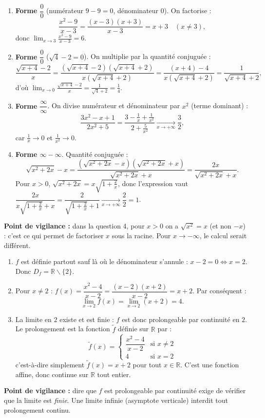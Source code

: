 \documentclass[11pt]{article}
\def\setminus{\mathbin{\backslash}}\let\smallsetminus\setminus
\begin{document}
\begin{corrige}
\begin{enumerate}
\item \textbf{Forme $\dfrac{0}{0}$} (numérateur $9-9=0$, dénominateur $0$). On factorise :
\[ \frac{x^2-9}{x-3}=\frac{(x-3)(x+3)}{x-3}=x+3 \quad (x\neq 3), \]
donc $\displaystyle\lim_{x\to 3}\frac{x^2-9}{x-3}=\boxed{6}$.
\item \textbf{Forme $\dfrac{0}{0}$} ($\sqrt{4}-2=0$). On multiplie par la quantité conjuguée :
\[ \frac{\sqrt{x+4}-2}{x}=\frac{(\sqrt{x+4}-2)(\sqrt{x+4}+2)}{x(\sqrt{x+4}+2)}=\frac{(x+4)-4}{x(\sqrt{x+4}+2)}=\frac{1}{\sqrt{x+4}+2}, \]
d'où $\displaystyle\lim_{x\to 0}\frac{\sqrt{x+4}-2}{x}=\frac{1}{\sqrt{4}+2}=\boxed{\frac{1}{4}}$.
\item \textbf{Forme $\dfrac{\infty}{\infty}$}. On divise numérateur et dénominateur par $x^2$ (terme dominant) :
\[ \frac{3x^2-x+1}{2x^2+5}=\frac{3-\frac{1}{x}+\frac{1}{x^2}}{2+\frac{5}{x^2}}\xrightarrow[x\to +\infty]{}\boxed{\frac{3}{2}}, \]
car $\frac{1}{x}\to 0$ et $\frac{1}{x^2}\to 0$.
\item \textbf{Forme $\infty-\infty$}. Quantité conjuguée :
\[ \sqrt{x^2+2x}-x=\frac{(\sqrt{x^2+2x}-x)(\sqrt{x^2+2x}+x)}{\sqrt{x^2+2x}+x}=\frac{2x}{\sqrt{x^2+2x}+x}. \]
Pour $x>0$, $\sqrt{x^2+2x}=x\sqrt{1+\frac{2}{x}}$, donc l'expression vaut $\dfrac{2x}{x\sqrt{1+\frac{2}{x}}+x}=\dfrac{2}{\sqrt{1+\frac{2}{x}}+1}\xrightarrow[x\to +\infty]{}\dfrac{2}{2}=\boxed{1}$.
\end{enumerate}
\textbf{Point de vigilance :} dans la question 4, pour $x>0$ on a $\sqrt{x^2}=x$ (et non $-x$) : c'est ce qui permet de factoriser $x$ sous la racine. Pour $x\to -\infty$, le calcul serait différent.
\end{corrige}

\begin{corrige}
\begin{enumerate}
\item $f$ est définie partout sauf là où le dénominateur s'annule : $x-2=0\iff x=2$. Donc $D_f=\mathbb{R}\setminus\{2\}$.
\item Pour $x\neq 2$ : $f(x)=\dfrac{x^2-4}{x-2}=\dfrac{(x-2)(x+2)}{x-2}=x+2$. Par conséquent :
\[ \lim_{x\to 2}f(x)=\lim_{x\to 2}(x+2)=\boxed{4}. \]
\item La limite en $2$ existe et est finie : $f$ est donc prolongeable par continuité en $2$. Le prolongement est la fonction $\tilde{f}$ définie sur $\mathbb{R}$ par :
\[ \tilde{f}(x)=\begin{cases} \dfrac{x^2-4}{x-2} & \text{si } x\neq 2 \\[4pt] 4 & \text{si } x=2 \end{cases} \]
c'est-à-dire simplement $\tilde{f}(x)=x+2$ pour tout $x\in\mathbb{R}$. C'est une fonction affine, donc continue sur $\mathbb{R}$ tout entier.
\end{enumerate}
\textbf{Point de vigilance :} dire que $f$ est prolongeable par continuité exige de vérifier que la limite est \emph{finie}. Une limite infinie (asymptote verticale) interdit tout prolongement continu.
\end{corrige}
\end{document}
